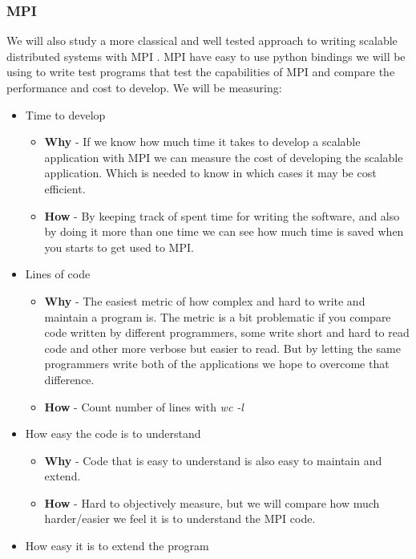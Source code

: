 \documentclass{article}
\begin{document}
\subsubsection{MPI}
We will also study a more classical and well tested approach to writing
scalable distributed systems with MPI \cite{gropp1996high}. MPI have easy
to use python bindings \cite{miller2002pympi} \cite{millerparallel} we will be
using to write test programs that test the capabilities of MPI and compare the
performance and cost to develop.
We will be measuring:
\begin{itemize}
\item Time to develop
\begin{itemize}
\item{ \textbf{Why} - If we know how much time it takes to develop a scalable application with
MPI we can measure the cost of developing the scalable application. Which is needed to
know in which cases it may be cost efficient.}
\item{ \textbf{How} - By keeping track of spent time for writing the software, 
and also by doing it more than one time we can see how much time is saved
when you starts to get used to MPI.}
\end{itemize}
\item Lines of code
\begin{itemize}
\item{ \textbf{Why} - The easiest metric of how complex and hard to write and
 maintain a program is. The metric is a bit problematic if you compare
 code written by different programmers, some write short and hard to read
 code and other more verbose but easier to read. But by letting the same
 programmers write both of the applications we hope to overcome that 
 difference.}
\item{ \textbf{How} - Count number of lines with \emph{wc -l}}
\end{itemize}
\item How easy the code is to understand
\begin{itemize}
\item{ \textbf{Why} - Code that is easy to understand is also easy to maintain and extend. }
\item{ \textbf{How} - Hard to objectively measure, but we will compare how much harder/easier we 
 feel it is to understand the MPI code. }
\end{itemize}
\item How easy it is to extend the program
\begin{itemize}

\end{itemize}
\end{itemize}
\end{document}
